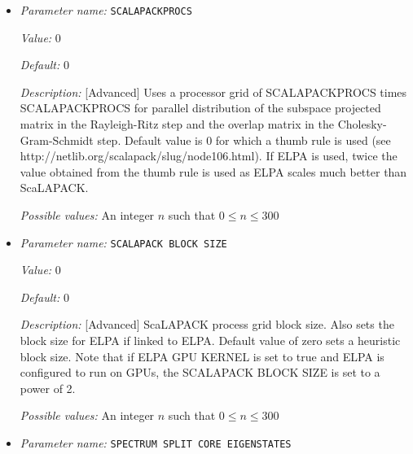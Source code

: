 \begin{itemize}
{\it Value:} false


{\it Default:} false


{\it Description:} [Advanced] Reuse upper bound of unwanted spectrum computed in the first SCF iteration via Lanczos iterations. Default setting is false.


{\it Possible values:} A boolean value (true or false)
\item {\it Parameter name:} {\tt SCALAPACKPROCS}
\label{parameters:SCF parameters/Eigen_2dsolver parameters/SCALAPACKPROCS}
\label{parameters:SCF_20parameters/Eigen_2dsolver_20parameters/SCALAPACKPROCS}


{\it Value:} 0


{\it Default:} 0


{\it Description:} [Advanced] Uses a processor grid of SCALAPACKPROCS times SCALAPACKPROCS for parallel distribution of the subspace projected matrix in the Rayleigh-Ritz step and the overlap matrix in the Cholesky-Gram-Schmidt step. Default value is 0 for which a thumb rule is used (see http://netlib.org/scalapack/slug/node106.html). If ELPA is used, twice the value obtained from the thumb rule is used as ELPA scales much better than ScaLAPACK.


{\it Possible values:} An integer $n$ such that $0\leq n \leq 300$
\item {\it Parameter name:} {\tt SCALAPACK BLOCK SIZE}
\label{parameters:SCF parameters/Eigen_2dsolver parameters/SCALAPACK BLOCK SIZE}
\label{parameters:SCF_20parameters/Eigen_2dsolver_20parameters/SCALAPACK_20BLOCK_20SIZE}


{\it Value:} 0


{\it Default:} 0


{\it Description:} [Advanced] ScaLAPACK process grid block size. Also sets the block size for ELPA if linked to ELPA. Default value of zero sets a heuristic block size. Note that if ELPA GPU KERNEL is set to true and ELPA is configured to run on GPUs, the SCALAPACK BLOCK SIZE is set to a power of 2.


{\it Possible values:} An integer $n$ such that $0\leq n \leq 300$
\item {\it Parameter name:} {\tt SPECTRUM SPLIT CORE EIGENSTATES}
\label{parameters:SCF parameters/Eigen_2dsolver parameters/SPECTRUM SPLIT CORE EIGENSTATES}
\label{parameters:SCF_20parameters/Eigen_2dsolver_20parameters/SPECTRUM_20SPLIT_20CORE_20EIGENSTATES}



\end{itemize}
